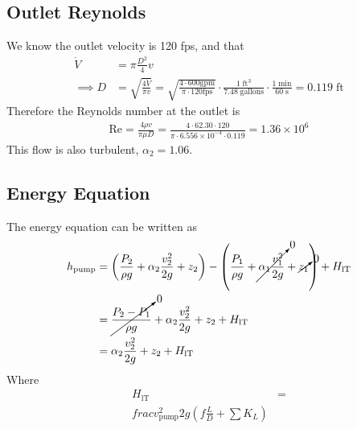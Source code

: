 \subsection{Outlet Reynolds}
We know the outlet velocity is 120 fps, and that
\begin{align*}
    \dot{V}    & = \pi \frac{D^2}{4} v                                                                                                                                                                                                     \\
    \implies D & = \sqrt{\frac{4 \dot{V}}{\pi v}} = \sqrt{\frac{4 \cdot 600 \text{gpm}}{\pi \cdot 120 \text{fps}}} \cdot \frac{1 \; \text{ft}^3}{7.48 \; \text{gallons}} \cdot \frac{1 \; \text{min}}{60 \; \text{s}} = 0.119 \; \text{ft}
\end{align*}
Therefore the Reynolds number at the outlet is
\begin{align*}
    \text{Re} = \frac{4 \rho v}{\pi \mu D} = \frac{4 \cdot 62.30 \cdot 120}{\pi \cdot 6.556 \times 10^{-4} \cdot 0.119} = 1.36 \times 10^6
\end{align*}
This flow is also turbulent, $\alpha_2 = 1.06$.

\subsection{Energy Equation}
The energy equation can be written as
\begin{align*}
    h_\text{pump} & = \left(\frac{P_2}{\rho g} + \alpha_2 \frac{v_2^2}{2g} + z_2\right) - \left(\frac{P_1}{\rho g} + \cancelto{0}{\alpha_1 \frac{v_1^2}{2g}} + \cancelto{0}{z_1}\right) + H_{\text{lT}} \\
                  & = \cancelto{0}{\frac{P_2 - P_1}{\rho g}} + \alpha_2 \frac{v_2^2}{2g} + z_2 + H_{\text{lT}}                                                                                          \\
                  & = \alpha_2 \frac{v_2^2}{2g} + z_2 + H_{\text{lT}}
\end{align*}
Where
\begin{align*}
    H_{\text{lT}} & = \\frac{v_\text{pump}^2}{2g} \left(f \frac{L}{D} + \sum K_L\right)
\end{align*}

